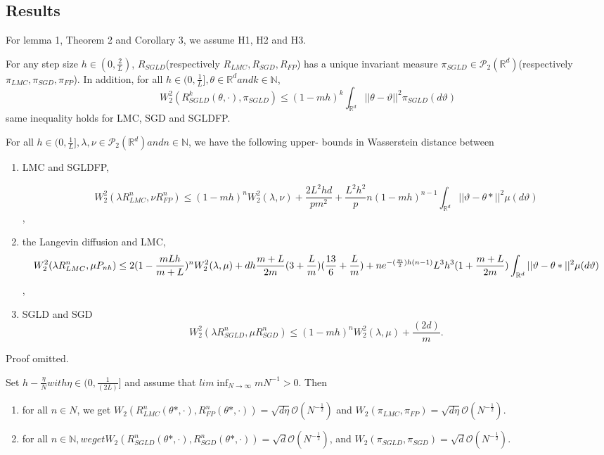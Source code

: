 \subsection{Results}
For lemma 1, Theorem 2 and Corollary 3, we assume H1, H2 and H3.
\begin{lemma}
For any step size $h \in (0, \frac{2}{L})$, $R_{SGLD}$(respectively $R_{LMC}, R_{SGD}, R_{FP}$) has a unique invariant measure $\pi_{SGLD}\in \mathcal{P}_2(\mathbb{R}^d)$(respectively $\pi_{LMC}, \pi_{SGD}, \pi_{FP}$). In addition, for all $h \in (0, \frac{1}{L}], \theta\in \mathbb{R}^d and k\in\mathbb{N}$,
$$W_2^2(R_{SGLD}^k(\theta, \cdot), \pi_{SGLD})\leq(1-mh)^k\int_{\mathbb{R}^d}||\theta-\vartheta||^2\pi_{SGLD}(d\vartheta)$$
same inequality holds for LMC, SGD and SGLDFP.
\end{lemma}
\begin{theorem}
For all $h\in(0,\frac{1}{L}], \lambda, \nu\in \mathcal{P}_2(\mathbb{R}^d) and n\in\mathbb{N}$, we have the following upper- bounds in Wasserstein distance between
\begin{enumerate}
	\item 
	LMC and SGLDFP,

\begin{dmath}	
W_2^2(\lambda R_{LMC}^n, \nu R_{FP}^n)\leq(1-mh)^nW_2^2(\lambda, \nu) + \frac{2L^2h d}{pm^2}+\frac{L^2h^2}{p}n(1-mh)^{n-1}\int_{\mathbb{R}^d}||\vartheta-\theta*||^2 \mu(d\vartheta)
\end{dmath},
	\item 
	the Langevin diffusion and LMC,
\begin{dmath}
W_2^2(\lambda R_{LMC}^n, \mu P_{nh})\leq2(1-\frac{mLh}{m+L})^nW_2^2(\lambda, \mu)+dh\frac{m+L}{2m}(3+\frac{L}{m})(\frac{13}{6}+\frac{L}{m})\\+ne^{-(\frac{m}{2})h(n-1)}L^3h^3(1+\frac{m+L}{2m})\int_{\mathbb{R}^d}||\vartheta - \theta*||^2 \mu(d\vartheta)
\end{dmath},
	\item 
	SGLD and SGD
	\begin{dmath}
	W_2^2(\lambda R_{SGLD}^n, \mu R_{SGD}^n)\leq (1-mh)^n W_2^2(\lambda, \mu)+\frac{(2d)}{m}.
	\end{dmath}
\end{enumerate}
\end{theorem}
Proof omitted.
\begin{cor}
Set $h - \frac{\eta}{N} with \eta \in (0, \frac{1}{(2L)}]$ and assume that $lim \inf_{N \to \infty}mN^{-1}>0$. Then
\begin{enumerate}
\item
for all $n \in N$, we get $W_2(R_{LMC}^n(\theta*, \cdot), R_{FP}^{n}(\theta*, \cdot)) = \sqrt{d\eta}\mathcal{O}(N^{-\frac{1}{2}})$ and $W_2(\pi_{LMC}, \pi_{FP}) = \sqrt{d\eta}\mathcal{O}(N^{-\frac{1}{2}})$.
\item 
for all $n\in \mathbb{N}, we get W_2(R_{SGLD}^{n}(\theta*, \cdot), R^n_{SGD}(\theta*, \cdot)) = \sqrt{d}\mathcal{O}(N^{-\frac{1}{2}})$, and $W_2(\pi_{SGLD}, \pi_{SGD}) = \sqrt{d}\mathcal{O}(N^{-\frac{1}{2}})$.
\end{enumerate}
\end{cor}